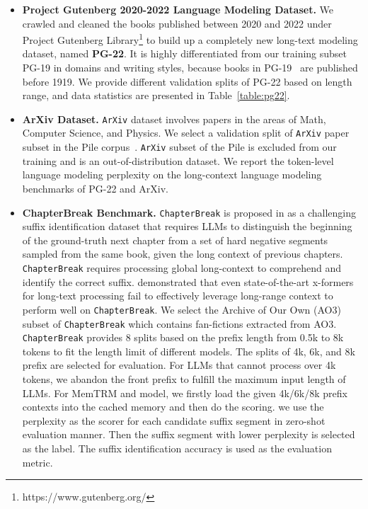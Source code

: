 \begin{itemize}[leftmargin=*]
\item \textbf{Project Gutenberg 2020-2022 Language Modeling Dataset.} We crawled and cleaned the books published between 2020 and 2022 under Project Gutenberg Library\footnote{https://www.gutenberg.org/} to build up a completely new long-text modeling dataset, named \textbf{PG-22}. It is highly differentiated from our training subset PG-19 in domains and writing styles, because books in PG-19~\citep{pg19} are published before 1919. We provide different validation splits of PG-22 based on length range, and data statistics are presented in Table~\ref{table:pg22}.
\item \textbf{ArXiv Dataset.} \texttt{ArXiv} dataset involves papers in the areas of Math, Computer Science, and Physics. We select a validation split of \texttt{ArXiv} paper subset in the Pile corpus~\citep{pile}. \texttt{ArXiv} subset of the Pile is excluded from our training and is an out-of-distribution dataset. We report the token-level language modeling perplexity on the long-context language modeling benchmarks of PG-22 and ArXiv. 
\item \textbf{ChapterBreak Benchmark.} \texttt{ChapterBreak} is proposed in \cite{ctb} as a challenging suffix identification dataset that requires LLMs to distinguish the beginning of the ground-truth next chapter from a set of hard negative segments sampled from the same book, given the long context of previous chapters. \texttt{ChapterBreak} requires processing global long-context to comprehend and identify the correct suffix. \cite{ctb} demonstrated that even state-of-the-art x-formers for long-text processing fail to effectively leverage long-range context to perform well on \texttt{ChapterBreak}. We select the Archive of Our Own (AO3) subset of \texttt{ChapterBreak} which contains fan-fictions extracted from AO3. \texttt{ChapterBreak} provides 8 splits based on the prefix length from 0.5k to 8k tokens to fit the length limit of different models. The splits of 4k, 6k, and 8k prefix are selected for evaluation. For LLMs that cannot process over 4k tokens, we abandon the front prefix to fulfill the maximum input length of LLMs. For MemTRM and \our{} model, we firstly load the given 4k/6k/8k prefix contexts into the cached memory and then do the scoring. we use the perplexity as the scorer for each candidate suffix segment in zero-shot evaluation manner. Then the suffix segment with lower perplexity is selected as the label. The suffix identification accuracy is used as the evaluation metric.
\end{itemize}

